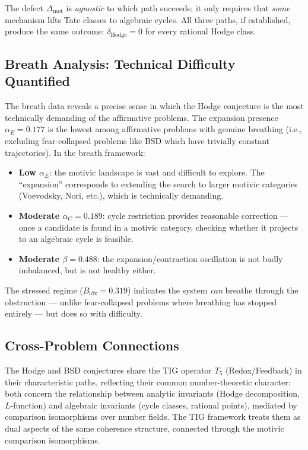 \documentclass[11pt]{article}
\theoremstyle{definition}
\begin{document}
\noindent
The defect $\Delta_{\mathrm{mot}}$ is \emph{agnostic} to which path
succeeds; it only requires that \emph{some} mechanism lifts Tate classes
to algebraic cycles.  All three paths, if established, produce the same
outcome: $\delta_{\mathrm{Hodge}} = 0$ for every rational Hodge class.

\subsection{Breath Analysis: Technical Difficulty Quantified}

The breath data reveals a precise sense in which the Hodge conjecture is
the most technically demanding of the affirmative problems.  The expansion
presence $\alpha_E = 0.177$ is the lowest among affirmative problems with
genuine breathing (i.e., excluding fear-collapsed problems like BSD which
have trivially constant trajectories).  In the breath framework:
\begin{itemize}
  \item \textbf{Low $\alpha_E$}: the motivic landscape is vast and
    difficult to explore.  The ``expansion'' corresponds to extending
    the search to larger motivic categories (Voevodsky, Nori, etc.),
    which is technically demanding.
  \item \textbf{Moderate $\alpha_C = 0.189$}: cycle restriction provides
    reasonable correction --- once a candidate is found in a motivic
    category, checking whether it projects to an algebraic cycle is
    feasible.
  \item \textbf{Moderate $\beta = 0.488$}: the expansion/contraction
    oscillation is not badly imbalanced, but is not healthy either.
\end{itemize}

\noindent
The stressed regime ($B_{\mathrm{idx}} = 0.319$) indicates the system
\emph{can} breathe through the obstruction --- unlike fear-collapsed
problems where breathing has stopped entirely --- but does so with
difficulty.

\subsection{Cross-Problem Connections}

The Hodge and BSD conjectures share the TIG operator $T_5$
(Redox/Feedback) in their characteristic paths, reflecting their common
number-theoretic character: both concern the relationship between
analytic invariants (Hodge decomposition, $L$-function) and algebraic
invariants (cycle classes, rational points), mediated by comparison
isomorphisms over number fields.  The TIG framework treats them as dual
aspects of the same coherence structure, connected through the motivic
comparison isomorphisms.
\end{document}
